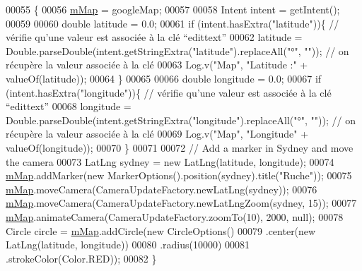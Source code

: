 \begin{DoxyCode}
00055                                                 \{
00056         \hyperlink{classfr_1_1campus_1_1laurainc_1_1honeybee_1_1_carte_activity_a101cebc8274b075aa3fee06ce55bf2fd}{mMap} = googleMap;
00057 
00058         Intent intent = getIntent();
00059 
00060         \textcolor{keywordtype}{double} latitude = 0.0;
00061         \textcolor{keywordflow}{if} (intent.hasExtra(\textcolor{stringliteral}{"latitude"}))\{ \textcolor{comment}{// vérifie qu'une valeur est associée à la clé “edittext”}
00062             latitude = Double.parseDouble(intent.getStringExtra(\textcolor{stringliteral}{"latitude"}).replaceAll(\textcolor{stringliteral}{"°"}, \textcolor{stringliteral}{""})); \textcolor{comment}{// on
       récupère la valeur associée à la clé}
00063             Log.v(\textcolor{stringliteral}{"Map"}, \textcolor{stringliteral}{"Latitude :"} + valueOf(latitude));
00064         \}
00065 
00066         \textcolor{keywordtype}{double} longitude = 0.0;
00067         \textcolor{keywordflow}{if} (intent.hasExtra(\textcolor{stringliteral}{"longitude"}))\{ \textcolor{comment}{// vérifie qu'une valeur est associée à la clé “edittext”}
00068             longitude = Double.parseDouble(intent.getStringExtra(\textcolor{stringliteral}{"longitude"}).replaceAll(\textcolor{stringliteral}{"°"}, \textcolor{stringliteral}{""})); \textcolor{comment}{// on
       récupère la valeur associée à la clé}
00069             Log.v(\textcolor{stringliteral}{"Map"}, \textcolor{stringliteral}{"Longitude"} + valueOf(longitude));
00070         \}
00071 
00072         \textcolor{comment}{// Add a marker in Sydney and move the camera}
00073         LatLng sydney = \textcolor{keyword}{new} LatLng(latitude, longitude);
00074         \hyperlink{classfr_1_1campus_1_1laurainc_1_1honeybee_1_1_carte_activity_a101cebc8274b075aa3fee06ce55bf2fd}{mMap}.addMarker(\textcolor{keyword}{new} MarkerOptions().position(sydney).title(\textcolor{stringliteral}{"Ruche"}));
00075         \hyperlink{classfr_1_1campus_1_1laurainc_1_1honeybee_1_1_carte_activity_a101cebc8274b075aa3fee06ce55bf2fd}{mMap}.moveCamera(CameraUpdateFactory.newLatLng(sydney));
00076         \hyperlink{classfr_1_1campus_1_1laurainc_1_1honeybee_1_1_carte_activity_a101cebc8274b075aa3fee06ce55bf2fd}{mMap}.moveCamera(CameraUpdateFactory.newLatLngZoom(sydney, 15));
00077         \hyperlink{classfr_1_1campus_1_1laurainc_1_1honeybee_1_1_carte_activity_a101cebc8274b075aa3fee06ce55bf2fd}{mMap}.animateCamera(CameraUpdateFactory.zoomTo(10), 2000, null);
00078         Circle circle = \hyperlink{classfr_1_1campus_1_1laurainc_1_1honeybee_1_1_carte_activity_a101cebc8274b075aa3fee06ce55bf2fd}{mMap}.addCircle(\textcolor{keyword}{new} CircleOptions()
00079                 .center(\textcolor{keyword}{new} LatLng(latitude, longitude))
00080                 .radius(10000)
00081                 .strokeColor(Color.RED));
00082     \}
\end{DoxyCode}


